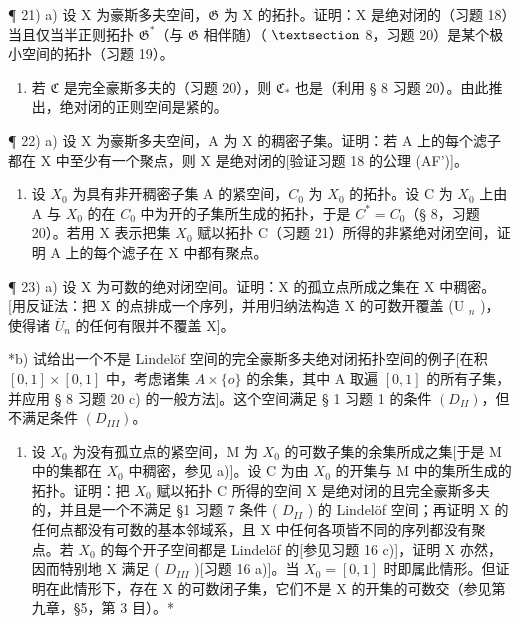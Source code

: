 ¶ 21) a) 设 X 为豪斯多夫空间，\(\mathfrak{G}\) 为 X 的拓扑。证明：X 是绝对闭的（习题 18）当且仅当半正则拓扑 \(\mathfrak{G}^*\)（与 \(\mathfrak{G}\) 相伴随）（ \(\S\) 8，习题 20）是某个极小空间的拓扑（习题 19）。

\begin{enumerate}
\def\labelenumi{\alph{enumi})}
\setcounter{enumi}{1}
\tightlist
\item
  若 \(\mathfrak{C}\) 是完全豪斯多夫的（习题 20），则 \(\mathfrak{C}_{*}\) 也是（利用 § 8 习题 20）。由此推出，绝对闭的正则空间是紧的。
\end{enumerate}

¶ 22) a) 设 X 为豪斯多夫空间，A 为 X 的稠密子集。证明：若 A 上的每个滤子都在 X 中至少有一个聚点，则 X 是绝对闭的{[}验证习题 18 的公理 (AF'){]}。

\begin{enumerate}
\def\labelenumi{\alph{enumi})}
\setcounter{enumi}{1}
\tightlist
\item
  设 \(X_{0}\) 为具有非开稠密子集 A 的紧空间，\(C_{0}\) 为 \(X_{0}\) 的拓扑。设 C 为 \(X_{0}\) 上由 A 与 \(X_{0}\) 的在 \(C_{0}\) 中为开的子集所生成的拓扑，于是 \(C^{*} = C_{0}\)（§ 8，习题 20）。若用 X 表示把集 \(X_{0}\) 赋以拓扑 C（习题 21）所得的非紧绝对闭空间，证明 A 上的每个滤子在 X 中都有聚点。
\end{enumerate}

¶ 23) a) 设 X 为可数的绝对闭空间。证明：X 的孤立点所成之集在 X 中稠密。{[}用反证法：把 X 的点排成一个序列，并用归纳法构造 X 的可数开覆盖 (U \(_{n}\) )，使得诸 \(\overline{U}_{n}\) 的任何有限并不覆盖 X{]}。

*b) 试给出一个不是 Lindelöf 空间的完全豪斯多夫绝对闭拓扑空间的例子{[}在积 \([0,1]\times[0,1]\) 中，考虑诸集 \(A\times\{o\}\) 的余集，其中 A 取遍 \([0,1]\) 的所有子集，并应用 § 8 习题 20 c) 的一般方法{]}。这个空间满足 § 1 习题 1 的条件 \((D_{II})\)，但不满足条件 \((D_{III})\)。

\begin{enumerate}
\def\labelenumi{\alph{enumi})}
\setcounter{enumi}{2}
\tightlist
\item
  设 \(X_{0}\) 为没有孤立点的紧空间，M 为 \(X_{0}\) 的可数子集的余集所成之集{[}于是 M 中的集都在 \(X_{0}\) 中稠密，参见 a){]}。设 C 为由 \(X_{0}\) 的开集与 M 中的集所生成的拓扑。证明：把 \(X_{0}\) 赋以拓扑 C 所得的空间 X 是绝对闭的且完全豪斯多夫的，并且是一个不满足 §1 习题 7 条件 ( \(D_{II}\) ) 的 Lindelöf 空间；再证明 X 的任何点都没有可数的基本邻域系，且 X 中任何各项皆不同的序列都没有聚点。若 \(X_{0}\) 的每个开子空间都是 Lindelöf 的{[}参见习题 16 c){]}，证明 X 亦然，因而特别地 X 满足 ( \(D_{III}\) ){[}习题 16 a){]}。当 \(X_{0} = [0,1]\) 时即属此情形。但证明在此情形下，存在 X 的可数闭子集，它们不是 X 的开集的可数交（参见第九章，§5，第 3 目）。*
\end{enumerate}

